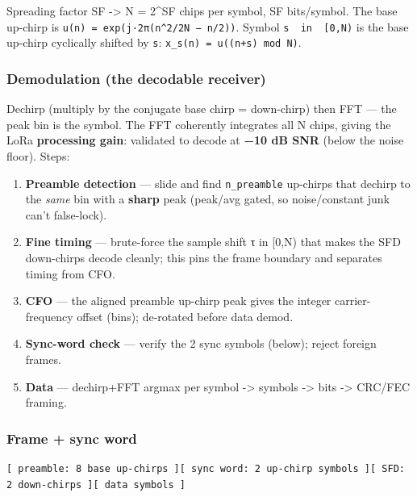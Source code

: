 \documentclass[
  10pt,
]{article}
\providecommand{\tightlist}{%
  \setlength{\itemsep}{0pt}\setlength{\parskip}{0pt}}
\begin{document}
Spreading factor SF -\textgreater{} N = 2\^{}SF chips per symbol, SF
bits/symbol. The base up-chirp is
\texttt{u(n)\ =\ exp(j·2π(n\^{}2/2N\ −\ n/2))}. Symbol
\texttt{s\ \ in\ \ {[}0,N)} is the base up-chirp cyclically shifted by
\texttt{s}: \texttt{x\_s(n)\ =\ u((n+s)\ mod\ N)}.

\hypertarget{demodulation-the-decodable-receiver}{%
\subsubsection{Demodulation (the decodable
receiver)}\label{demodulation-the-decodable-receiver}}

Dechirp (multiply by the conjugate base chirp = down-chirp) then FFT ---
the peak bin is the symbol. The FFT coherently integrates all N chips,
giving the LoRa \textbf{processing gain}: validated to decode at
\textbf{−10 dB SNR} (below the noise floor). Steps:

\begin{enumerate}
\def\labelenumi{\arabic{enumi}.}
\tightlist
\item
  \textbf{Preamble detection} --- slide and find \texttt{n\_preamble}
  up-chirps that dechirp to the \emph{same} bin with a \textbf{sharp}
  peak (peak/avg gated, so noise/constant junk can't false-lock).
\item
  \textbf{Fine timing} --- brute-force the sample shift τ in {[}0,N)
  that makes the SFD down-chirps decode cleanly; this pins the frame
  boundary and separates timing from CFO.
\item
  \textbf{CFO} --- the aligned preamble up-chirp peak gives the integer
  carrier-frequency offset (bins); de-rotated before data demod.
\item
  \textbf{Sync-word check} --- verify the 2 sync symbols (below); reject
  foreign frames.
\item
  \textbf{Data} --- dechirp+FFT argmax per symbol -\textgreater{}
  symbols -\textgreater{} bits -\textgreater{} CRC/FEC framing.
\end{enumerate}

\hypertarget{frame--sync-word}{%
\subsubsection{Frame + sync word}\label{frame--sync-word}}

\begin{verbatim}
[ preamble: 8 base up-chirps ][ sync word: 2 up-chirp symbols ][ SFD: 2 down-chirps ][ data symbols ]
\end{verbatim}
\end{document}
